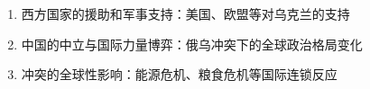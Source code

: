 \begin{enumerate}
    \item 西方国家的援助和军事支持：美国、欧盟等对乌克兰的支持
    \item 中国的中立与国际力量博弈：俄乌冲突下的全球政治格局变化
    \item 冲突的全球性影响：能源危机、粮食危机等国际连锁反应
\end{enumerate}